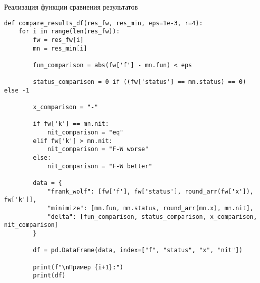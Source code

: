 \documentclass{article}
\begin{document}
\newpage

Реализация функции сравнения результатов

\begin{lstlisting}
def compare_results_df(res_fw, res_min, eps=1e-3, r=4):
    for i in range(len(res_fw)):
        fw = res_fw[i]
        mn = res_min[i]

        fun_comparison = abs(fw['f'] - mn.fun) < eps

        status_comparison = 0 if ((fw['status'] == mn.status) == 0) else -1

        x_comparison = "-"

        if fw['k'] == mn.nit:
            nit_comparison = "eq"
        elif fw['k'] > mn.nit:
            nit_comparison = "F-W worse"
        else:
            nit_comparison = "F-W better"

        data = {
            "frank_wolf": [fw['f'], fw['status'], round_arr(fw['x']), fw['k']],
            "minimize": [mn.fun, mn.status, round_arr(mn.x), mn.nit],
            "delta": [fun_comparison, status_comparison, x_comparison, nit_comparison]
        }

        df = pd.DataFrame(data, index=["f", "status", "x", "nit"])

        print(f"\nПример {i+1}:")
        print(df)
\end{lstlisting}
\end{document}
